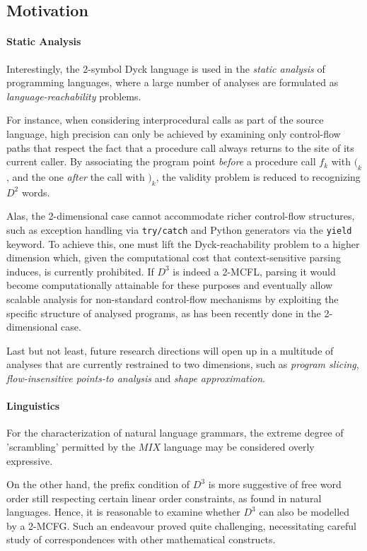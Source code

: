 \documentclass{llncs}
\begin{document}
\subsection{Motivation}

\paragraph{\textbf{Static Analysis}}
Interestingly, the 2-symbol Dyck language is used in the \textit{static analysis} of programming languages, where a large number of analyses are formulated as \textit{language-reachability} problems\cite{reps}.

For instance, when considering interprocedural calls as part of the source language, high precision can only be achieved by examining only control-flow paths that respect the fact that a procedure call always returns to the site of its current caller\cite{reps2}. By associating the program point \textit{before} a procedure call $f_k$ with $(_k$, and the one \textit{after} the call with $)_k$, the validity problem is reduced to recognizing $D^2$ words. 

Alas, the 2-dimensional case cannot accommodate richer control-flow structures, such as exception handling via \texttt{try/catch} and Python generators via the \texttt{yield} keyword. To achieve this, one must lift the Dyck-reachability problem to a higher dimension which, given the computational cost that context-sensitive parsing induces, is currently prohibited. If $D^3$ is indeed a 2-MCFL, parsing it would become computationally attainable for these purposes and eventually allow scalable analysis for non-standard control-flow mechanisms by exploiting the specific structure of analysed programs, as has been recently done in the 2-dimensional case\cite{andreas}.

Last but not least, future research directions will open up in a multitude of analyses that are currently restrained to two dimensions, such as \textit{program slicing}, \textit{flow-insensitive points-to analysis} and \textit{shape approximation}\cite{reps}.

\paragraph{\textbf{Linguistics}}
For the characterization of natural language grammars, the extreme degree of ’scrambling’ permitted by the $MIX$ language may be considered overly expressive\cite{kanazawa}.

On the other hand, the prefix condition of $D^3$ is more suggestive of free word order still respecting certain linear order constraints, as found in natural languages. Hence, it is reasonable to examine whether $D^3$ can also be modelled by a 2-MCFG. Such an endeavour proved quite challenging, necessitating careful study of correspondences with other mathematical constructs.
\end{document}
